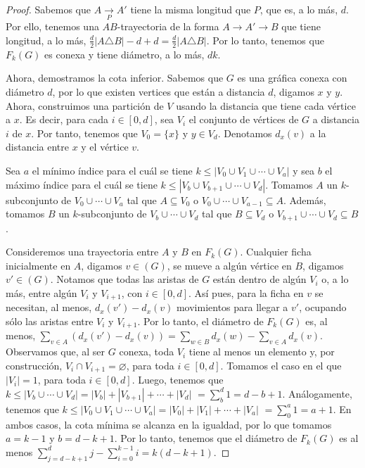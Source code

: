 \begin{proof}
    Sabemos que $A\xrightarrow[P]{} A'$ tiene la misma longitud que $P$, que es,
    a lo m\'as, $d$. Por ello, tenemos una $AB$-trayectoria de la forma
    $A\rightarrow A'\rightarrow B$ que tiene longitud, a lo m\'as,
    $\frac{d}{2}|A\triangle B|-d +d =\frac{d}{2}|A\triangle B|$. Por lo tanto,
    tenemos que $F_{k}(G)$ es conexa y tiene di\'ametro, a lo m\'as, $d k$.

    Ahora, demostramos la cota inferior. Sabemos que $G$ es una gr\'afica conexa
    con di\'ametro $d$, por lo que existen vertices que est\'an a distancia $d$,
    digamos $x$ y $y$. Ahora, construimos una partici\'on de $V$ usando la
    distancia que tiene cada v\'ertice a $x$. Es decir, para cada $i\in [0,d]$,
    sea $V_{i}$ el conjunto de v\'ertices de $G$ a distancia $i$ de $x$. Por
    tanto, tenemos que $V_{0}=\{x\}$ y $y\in V_{d}$. Denotamos $d_x(v)$ a la
    distancia entre $x$ y el v\'ertice $v$.

    Sea $a$ el m\'inimo \'indice para el cu\'al se tiene $k \leq |V_{0}\cup
    V_{1}\cup \cdots \cup V_{a}|$ y sea $b$ el m\'aximo \'indice para el cu\'al
    se tiene $k\leq |V_{b}\cup V_{b+1}\cup \cdots \cup V_{d}|$. Tomamos $A$ un
    $k$-subconjunto de $V_{0}\cup \cdots \cup V_{a}$  tal que $A\subseteq V_{0}$
    o $V_{0}\cup \cdots \cup V_{a-1}\subseteq A$. Adem\'as, tomamos $B$ un
    $k$-subconjunto de $V_{b}\cup \cdots \cup V_{d}$ tal que $B\subseteq V_{d}$
    o $V_{b+1}\cup \cdots \cup V_{d} \subseteq B$. 

    Consideremos una trayectoria entre $A$ y $B$ en $F_{k}(G)$. Cualquier ficha
    inicialmente en $A$, digamos $v \in (G)$, se mueve a alg\'un v\'ertice en
    $B$, digamos $v'\in (G)$. Notamos que todas las aristas de $G$ est\'an
    dentro de alg\'un $V_{i}$ o, a lo m\'as, entre alg\'un $V_{i}$ y $V_{i+1}$,
    con $i\in[0,d]$. As\'i pues, para la ficha en $v$ se necesitan, al menos,
    $d_x(v')-d_x(v)$ movimientos para llegar a $v'$, ocupando s\'olo las aristas
    entre $V_{i}$ y $V_{i+1}$. Por lo tanto, el di\'ametro de $F_{k}(G)$ es, al
    menos, $\sum_{v\in A}(d_x(v')-d_x(v))= \sum_{w\in B}d_x(w)-\sum_{v\in
    A}d_x(v)$. Observamos que, al ser $G$ conexa, toda $V_{i}$ tiene al menos un
    elemento y, por construcci\'on, $V_{i} \cap V_{i+1}=\varnothing$, para toda
    $i\in [0,d]$. Tomamos el caso en el que $|V_{i}|=1$, para toda $i\in [0,d]$.
    Luego, tenemos que $k\leq |V_{b}\cup\cdots\cup
    V_{d}|=|V_{b}|+|V_{b+1}|+\cdots +|V_d|$ $=\sum_{b}^{d}1 = d -b+1$.
    An\'alogamente, tenemos que $k\leq |V_{0}\cup V_{1}\cup \cdots \cup
    V_{a}|=|V_{0}|+|V_{1}|+\cdots + |V_{a}|$ $=\sum_{0}^{a} 1 = a+1$. En ambos
    casos, la cota m\'inima se alcanza en la igualdad, por lo que tomamos
    $a=k-1$ y $b=d-k+1$. Por lo tanto, tenemos que el di\'ametro de $F_{k}(G)$
    es al menos $\sum_{j=d -k+1}^{d}j - \sum_{i=0}^{k-1}i = k(d-k+1)$.
\end{proof}

